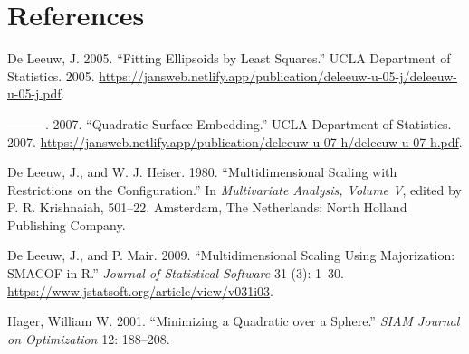 \documentclass[
  12pt,
]{article}
\newlength{\cslhangindent}
\newenvironment{CSLReferences}[2] %
 {\begin{list}{}{%
  \setlength{\itemindent}{0pt}
  \setlength{\leftmargin}{0pt}
  \setlength{\parsep}{0pt}
  \ifodd #1
   \setlength{\leftmargin}{\cslhangindent}
   \setlength{\itemindent}{-1\cslhangindent}
  \fi
  \setlength{\itemsep}{#2\baselineskip}}}
 {\end{list}}
\begin{document}
\section*{References}\label{references}

\label{refs}
\begin{CSLReferences}{1}{0}
De Leeuw, J. 2005. {``{Fitting Ellipsoids by Least Squares}.''} UCLA Department of Statistics. 2005. \url{https://jansweb.netlify.app/publication/deleeuw-u-05-j/deleeuw-u-05-j.pdf}.

---------. 2007. {``{Quadratic Surface Embedding}.''} UCLA Department of Statistics. 2007. \url{https://jansweb.netlify.app/publication/deleeuw-u-07-h/deleeuw-u-07-h.pdf}.

De Leeuw, J., and W. J. Heiser. 1980. {``Multidimensional Scaling with Restrictions on the Configuration.''} In \emph{Multivariate Analysis, Volume {V}}, edited by P. R. Krishnaiah, 501--22. Amsterdam, The Netherlands: North Holland Publishing Company.

De Leeuw, J., and P. Mair. 2009. {``{Multidimensional Scaling Using Majorization: SMACOF in R}.''} \emph{Journal of Statistical Software} 31 (3): 1--30. \url{https://www.jstatsoft.org/article/view/v031i03}.

Hager, William W. 2001. {``{Minimizing a Quadratic over a Sphere}.''} \emph{SIAM Journal on Optimization} 12: 188--208.

\end{CSLReferences}
\end{document}
